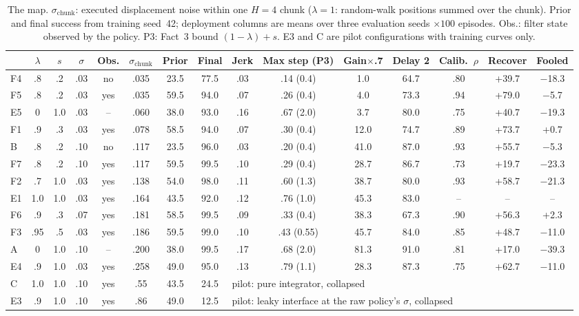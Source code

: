 \documentclass{article}
\newcommand{\schunk}{\sigma_{\mathrm{chunk}}}
\begin{document}
\begin{table}[t]
\centering
\caption{The map. $\schunk$: executed displacement noise within one $H=4$ chunk ($\lambda=1$: random-walk positions summed over the chunk). Prior and final success from training seed~42; deployment columns are means over three evaluation seeds $\times100$ episodes. Obs.: filter state observed by the policy. P3: Fact~3 bound $(1-\lambda)+s$. E3 and C are pilot configurations with training curves only.}
\label{tab:points}
\small
\setlength{\tabcolsep}{3.3pt}
\begin{tabular}{l ccc c c | cc | cc | cc | ccc}
\toprule
& $\lambda$ & $s$ & $\sigma$ & Obs. & $\schunk$ & Prior & Final & Jerk & Max step (P3) & Gain$\times$.7 & Delay 2 & Calib.\ $\rho$ & Recover & Fooled \\
\midrule
F4 & .8   & .2  & .03 & no  & .035 & 23.5 & 77.5 & .03 & .14 (0.4) & 1.0  & 64.7 & .80 & +39.7 & $-$18.3 \\
F5 & .8   & .2  & .03 & yes & .035 & 59.5 & 94.0 & .07 & .26 (0.4) & 4.0  & 73.3 & .94 & +79.0 & $-$5.7 \\
E5 & 0    & 1.0 & .03 & --  & .060 & 38.0 & 93.0 & .16 & .67 (2.0) & 3.7  & 80.0 & .75 & +40.7 & $-$19.3 \\
F1 & .9   & .3  & .03 & yes & .078 & 58.5 & 94.0 & .07 & .30 (0.4) & 12.0 & 74.7 & .89 & +73.7 & +0.7 \\
B  & .8   & .2  & .10 & no  & .117 & 23.5 & 96.0 & .03 & .20 (0.4) & 41.0 & 87.0 & .93 & +55.7 & $-$5.3 \\
F7 & .8   & .2  & .10 & yes & .117 & 59.5 & 99.5 & .10 & .29 (0.4) & 28.7 & 86.7 & .73 & +19.7 & $-$23.3 \\
F2 & .7   & 1.0 & .03 & yes & .138 & 54.0 & 98.0 & .11 & .60 (1.3) & 38.7 & 80.0 & .93 & +58.7 & $-$21.3 \\
E1 & 1.0  & 1.0 & .03 & yes & .164 & 43.5 & 92.0 & .12 & .76 (1.0) & 45.3 & 83.0 & -- & -- & -- \\
F6 & .9   & .3  & .07 & yes & .181 & 58.5 & 99.5 & .09 & .33 (0.4) & 38.3 & 67.3 & .90 & +56.3 & +2.3 \\
F3 & .95  & .5  & .03 & yes & .186 & 59.5 & 99.0 & .10 & .43 (0.55) & 45.7 & 84.0 & .85 & +48.7 & $-$11.0 \\
A  & 0    & 1.0 & .10 & --  & .200 & 38.0 & 99.5 & .17 & .68 (2.0) & 81.3 & 91.0 & .81 & +17.0 & $-$39.3 \\
E4 & .9   & 1.0 & .03 & yes & .258 & 49.0 & 95.0 & .13 & .79 (1.1) & 28.3 & 87.3 & .75 & +62.7 & $-$11.0 \\
\midrule
C  & 1.0  & 1.0 & .10 & yes & .55  & 43.5 & 24.5 & \multicolumn{7}{l}{pilot: pure integrator, collapsed} \\
E3 & .9   & 1.0 & .10 & yes & .86  & 49.0 & 12.5 & \multicolumn{7}{l}{pilot: leaky interface at the raw policy's $\sigma$, collapsed} \\
\bottomrule
\end{tabular}
\end{table}
\end{document}
